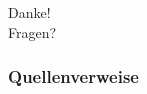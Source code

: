 \documentclass[11pt,aspectratio=169,notheorems]{beamer}
\begin{document}
\begin{frame}[standout]
    \Huge Danke!\\[2em]
    Fragen?
\end{frame}

\begin{frame}[allowframebreaks]
    \frametitle{Quellenverweise}
    \printbibliography[heading=none]
\end{frame}
    
\end{document}
